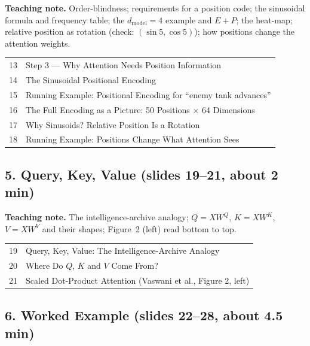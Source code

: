 \documentclass[11pt]{article}
\begin{document}
\textbf{Teaching note.} Order-blindness; requirements for a position code; the sinusoidal formula and frequency table; the $d_{\text{model}}=4$ example and $E+P$; the heat-map; relative position as rotation (check: $(\sin5,\cos5)$); how positions change the attention weights.

\begin{center}\small\renewcommand{\arraystretch}{1.1}\begin{tabularx}{\textwidth}{@{}r X@{}}13 & Step 3 --- Why Attention Needs Position Information\\
14 & The Sinusoidal Positional Encoding\\
15 & Running Example: Positional Encoding for ``enemy tank advances''\\
16 & The Full Encoding as a Picture: 50 Positions $\times$ 64 Dimensions\\
17 & Why Sinusoids? Relative Position Is a Rotation\\
18 & Running Example: Positions Change What Attention Sees\\\end{tabularx}\end{center}

\subsection{5. Query, Key, Value \normalfont\small\color{GreyN}(slides 19--21, about 2 min)}

\textbf{Teaching note.} The intelligence-archive analogy; $Q=XW^Q$, $K=XW^K$, $V=XW^V$ and their shapes; Figure~2 (left) read bottom to top.

\begin{center}\small\renewcommand{\arraystretch}{1.1}\begin{tabularx}{\textwidth}{@{}r X@{}}19 & Query, Key, Value: The Intelligence-Archive Analogy\\
20 & Where Do $Q$, $K$ and $V$ Come From?\\
21 & Scaled Dot-Product Attention (Vaswani et al., Figure 2, left)\\\end{tabularx}\end{center}

\subsection{6. Worked Example \normalfont\small\color{GreyN}(slides 22--28, about 4.5 min)}
\end{document}
